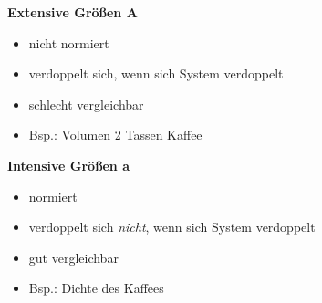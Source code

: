 \newpage

\textbf{Extensive Größen A}
\begin{itemize}
	\item nicht normiert
	\item verdoppelt sich, wenn sich System verdoppelt
	\item schlecht vergleichbar
	\item Bsp.: Volumen 2 Tassen Kaffee
\end{itemize}

\textbf{Intensive Größen a}
\begin{itemize}
	\item normiert
	\item verdoppelt sich \textit{nicht}, wenn sich System verdoppelt
	\item gut vergleichbar
	\item Bsp.: Dichte des Kaffees
\end{itemize}